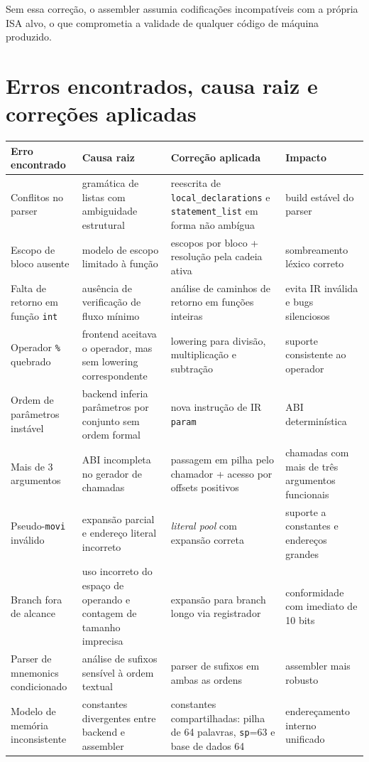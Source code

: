 \documentclass[12pt,a4paper]{article}
\begin{document}
Sem essa correção, o assembler assumia codificações incompatíveis com a própria ISA alvo, o que comprometia a validade de qualquer código de máquina produzido.

\section{Erros encontrados, causa raiz e correções aplicadas}
\begin{longtable}{>{\raggedright\arraybackslash}p{} >{\raggedright\arraybackslash}p{} >{\raggedright\arraybackslash}p{} >{\raggedright\arraybackslash}p{}}
\toprule
\textbf{Erro encontrado} & \textbf{Causa raiz} & \textbf{Correção aplicada} & \textbf{Impacto} \\
\midrule
\endhead
Conflitos no parser & gramática de listas com ambiguidade estrutural & reescrita de \texttt{local\_declarations} e \texttt{statement\_list} em forma não ambígua & build estável do parser \\
Escopo de bloco ausente & modelo de escopo limitado à função & escopos por bloco + resolução pela cadeia ativa & sombreamento léxico correto \\
Falta de retorno em função \texttt{int} & ausência de verificação de fluxo mínimo & análise de caminhos de retorno em funções inteiras & evita IR inválida e bugs silenciosos \\
Operador \texttt{\%} quebrado & frontend aceitava o operador, mas sem lowering correspondente & lowering para divisão, multiplicação e subtração & suporte consistente ao operador \\
Ordem de parâmetros instável & backend inferia parâmetros por conjunto sem ordem formal & nova instrução de IR \texttt{param} & ABI determinística \\
Mais de 3 argumentos & ABI incompleta no gerador de chamadas & passagem em pilha pelo chamador + acesso por offsets positivos & chamadas com mais de três argumentos funcionais \\
Pseudo-\texttt{movi} inválido & expansão parcial e endereço literal incorreto & \emph{literal pool} com expansão correta & suporte a constantes e endereços grandes \\
Branch fora de alcance & uso incorreto do espaço de operando e contagem de tamanho imprecisa & expansão para branch longo via registrador & conformidade com imediato de 10 bits \\
Parser de mnemonics condicionado & análise de sufixos sensível à ordem textual & parser de sufixos em ambas as ordens & assembler mais robusto \\
Modelo de memória inconsistente & constantes divergentes entre backend e assembler & constantes compartilhadas: pilha de 64 palavras, \texttt{sp}=63 e base de dados 64 & endereçamento interno unificado \\
\bottomrule
\end{longtable}
\end{document}
